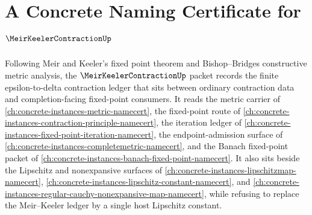 \chapter{A Concrete Naming Certificate for $\MeirKeelerContractionUp$}
\label{ch:concrete-instances-meir-keeler-contraction-namecert}

Following Meir and Keeler's fixed point theorem and Bishop--Bridges constructive metric analysis, the $\MeirKeelerContractionUp$ packet records the finite epsilon-to-delta contraction ledger that sits between ordinary contraction data and completion-facing fixed-point consumers. It reads the metric carrier of \autoref{ch:concrete-instances-metric-namecert}, the fixed-point route of \autoref{ch:concrete-instances-contraction-principle-namecert}, the iteration ledger of \autoref{ch:concrete-instances-fixed-point-iteration-namecert}, the endpoint-admission surface of \autoref{ch:concrete-instances-completemetric-namecert}, and the Banach fixed-point packet of \autoref{ch:concrete-instances-banach-fixed-point-namecert}. It also sits beside the Lipschitz and nonexpansive surfaces of \autoref{ch:concrete-instances-lipschitzmap-namecert}, \autoref{ch:concrete-instances-lipschitz-constant-namecert}, and \autoref{ch:concrete-instances-regular-cauchy-nonexpansive-map-namecert}, while refusing to replace the Meir--Keeler ledger by a single host Lipschitz constant.

